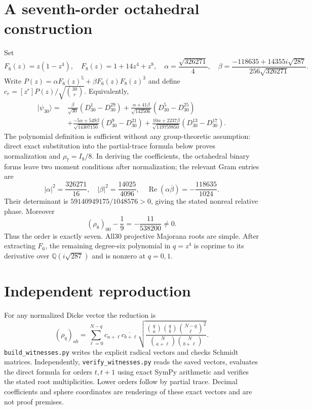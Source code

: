 \documentclass[11pt]{article}
\begin{document}
\section*{A seventh-order octahedral construction}
Set
\[
F_6(z)=z(1-z^4),\quad F_8(z)=1+14z^4+z^8,\quad
\alpha=\frac{\sqrt{326271}}4,\quad
\beta=\frac{-118635+14355i\sqrt{287}}{256\sqrt{326271}}.
\]
Write $P(z)=\alpha F_6(z)^5+\beta F_6(z)F_8(z)^3$
and define $c_r=[z^r]P(z)/\sqrt{\binom{30}r}$.
Equivalently,
\begin{align*}
|\psi_{30}\rangle={}&\frac{\beta}{\sqrt{30}}(D_{30}^1-D_{30}^{29})
+\frac{\alpha+41\beta}{\sqrt{142506}}(D_{30}^5-D_{30}^{25})\\
&+\frac{-5\alpha+549\beta}{\sqrt{14307150}}(D_{30}^9-D_{30}^{21})
+\frac{10\alpha+2237\beta}{\sqrt{119759850}}(D_{30}^{13}-D_{30}^{17}).
\end{align*}
The polynomial definition is sufficient without any group-theoretic
assumption: direct exact substitution into the partial-trace formula below
proves normalization and $\rho_7=I_8/8$. In deriving the coefficients,
the octahedral binary forms leave two moment conditions after normalization;
the relevant Gram entries are
\[
|\alpha|^2=\frac{326271}{16},\quad
|\beta|^2=\frac{14025}{4096},\quad
\operatorname{Re}(\alpha\overline\beta)=-\frac{118635}{1024}.
\]
Their determinant is $59140949175/1048576>0$, giving the stated nonreal
relative phase. Moreover
\[
(\rho_8)_{00}-\frac19=-\frac{11}{538200}\ne0.
\]
Thus the order is exactly seven. All30 projective Majorana roots are simple.
After extracting $F_6$, the remaining degree-six polynomial in $q=z^4$
is coprime to its derivative over $\mathbb Q(i\sqrt{287})$ and is nonzero
at $q=0,1$.

\section*{Independent reproduction}
For any normalized Dicke vector the reduction is
\[
(\rho_q)_{ab}=\sum_{\ell=0}^{N-q}c_{a+\ell}\overline{c_{b+\ell}}
\sqrt{\frac{\binom qa\binom qb\binom{N-q}{\ell}^2}
{\binom N{a+\ell}\binom N{b+\ell}}}.
\]
\texttt{build\_witnesses.py} writes the explicit radical vectors and checks
Schmidt matrices. Independently, \texttt{verify\_witnesses.py} reads the saved
vectors, evaluates the direct formula for orders $t,t+1$ using exact SymPy
arithmetic and verifies the stated root multiplicities. Lower orders follow
by partial trace. Decimal coefficients and sphere coordinates are renderings
of these exact vectors and are not proof premises.
\end{document}
